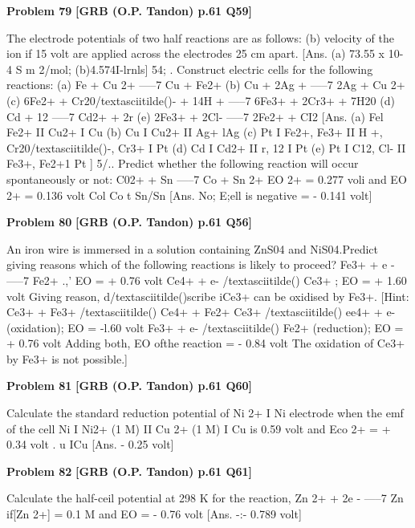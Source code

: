 \begin{problembox}
\textbf{Problem 79} \hfill \textbf{[GRB (O.P. Tandon) p.61 Q59]}
\label{q:ext-grb_all_questions-79}

The electrode potentials of two half reactions are as follows: 
(b) velocity of the ion if 15 volt are applied across the 
electrodes 25 cm apart. 
[Ans. 
(a) 73.55 x 10- 4 S m 2/mol; (b)4.574I-lrnls] 
54; . Construct electric cells for the following reactions: 
(a) Fe + Cu 2+ -----7 Cu + Fe2+ 
(b) Cu + 2Ag + -----7 2Ag + Cu 2+ 
(c) 6Fe2+ + Cr20/textasciitilde()- + 14H + -----7 6Fe3+ + 2Cr3+ + 7H20 
(d) Cd + 12 -----7 Cd2+ + 2r 
(e) 2Fe3+ + 2Cl- -----7 2Fe2+ + CI2 
[Ans. (a) Fel Fe2+ II Cu2+ I Cu 
(b) Cu I Cu2+ II Ag+ lAg 
(c) Pt I Fe2+, Fe3+ II H +, Cr20/textasciitilde()-, Cr3+ I Pt 
(d) Cd I Cd2+ II r, 12 I Pt 
(e) Pt I C12, Cl- II Fe3+, Fe2+1 Pt ] 
5/.. Predict 
whether 
the 
following 
reaction 
will 
occur 
spontaneously or not: 
C02+ + Sn -----7 Co + Sn 2+ 
EO 
2+ = 0.277 voli and 
EO 
2+ = 0.136 volt 
Col Co 
t 
Sn/Sn 
[Ans. 
No; E;ell is negative = - 0.141 volt]
\end{problembox}

\begin{problembox}
\textbf{Problem 80} \hfill \textbf{[GRB (O.P. Tandon) p.61 Q56]}
\label{q:ext-grb_all_questions-80}

An iron wire is immersed in a solution containing ZnS04 and 
NiS04.Predict giving reasons which of the following 
reactions is likely to proceed? 
Fe3+ + e - -----7 Fe2+ .,' 
EO = + 0.76 volt 
Ce4+ + e- /textasciitilde() 
Ce3+ ; 
EO = + 1.60 volt 
Giving reason, d/textasciitilde()scribe iCe3+ can be oxidised by Fe3+. 
[Hint: Ce3+ + Fe3+ /textasciitilde() 
Ce4+ + Fe2+ 
Ce3+ /textasciitilde() 
ee4+ + e- (oxidation); EO = -l.60 volt 
Fe3+ + e- /textasciitilde() 
Fe2+ 
(reduction); EO = + 0.76 volt 
Adding both, EO ofthe reaction = - 0.84 volt 
The oxidation of Ce3+ by Fe3+ is not possible.]
\end{problembox}

\begin{problembox}
\textbf{Problem 81} \hfill \textbf{[GRB (O.P. Tandon) p.61 Q60]}
\label{q:ext-grb_all_questions-81}

Calculate the standard reduction potential of Ni 2+ I Ni 
electrode when the emf of the cell 
Ni I Ni2+ (1 M) II Cu 2+ (1 M) I Cu 
is 0.59 volt and Eco 2+ 
= + 0.34 volt 
. 
u 
ICu 
[Ans. 
- 0.25 volt]
\end{problembox}

\begin{problembox}
\textbf{Problem 82} \hfill \textbf{[GRB (O.P. Tandon) p.61 Q61]}
\label{q:ext-grb_all_questions-82}

Calculate the half-ceil potential at 298 K for the reaction, 
Zn 2+ + 2e - -----7 Zn 
if[Zn 2+] = 0.1 M and EO = - 0.76 volt 
[Ans. 
-:- 0.789 volt]
\end{problembox}

